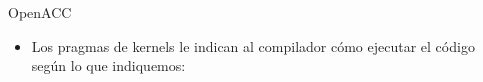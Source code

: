 \documentclass[aspectratio=169]{beamer}
\begin{document}
\begin{frame}{OpenACC}
    \begin{itemize}
        \item Los pragmas de kernels le indican al compilador cómo ejecutar el código según lo que indiquemos:
    \end{itemize}

    \begin{figure}
        \centering
    \end{figure}
\end{frame}
\end{document}
